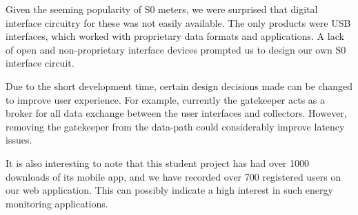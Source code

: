 \documentclass[10pt, conference, compsocconf, english]{IEEEtran}
\begin{document}
Given the seeming popularity of S0 meters, we were surprised that digital interface circuitry for these was not easily available. The only products were USB interfaces, which worked with proprietary
data formats and applications. A lack of open and non-proprietary
interface devices prompted us to design our own S0 interface circuit.

Due to the short development time, certain design decisions made can be changed to improve user experience. For example, currently the gatekeeper acts as a broker for all data exchange between the user interfaces and collectors. However, removing the gatekeeper from the data-path could considerably improve latency issues.

It is also interesting to note that this student project has had over
1000 downloads of its mobile app, and we have recorded over 700 registered
users on our web application. This can possibly indicate a high interest
in such energy monitoring applications.



\end{document}
